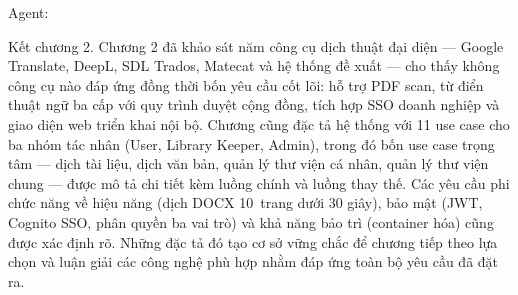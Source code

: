 Agent:

Kết chương 2. Chương 2 đã khảo sát năm công cụ dịch thuật đại diện --- Google Translate, DeepL, SDL Trados, Matecat và hệ thống đề xuất --- cho thấy không công cụ nào đáp ứng đồng thời bốn yêu cầu cốt lõi: hỗ trợ PDF scan, từ điển thuật ngữ ba cấp với quy trình duyệt cộng đồng, tích hợp SSO doanh nghiệp và giao diện web triển khai nội bộ. Chương cũng đặc tả hệ thống với 11 use case cho ba nhóm tác nhân (User, Library Keeper, Admin), trong đó bốn use case trọng tâm --- dịch tài liệu, dịch văn bản, quản lý thư viện cá nhân, quản lý thư viện chung --- được mô tả chi tiết kèm luồng chính và luồng thay thế. Các yêu cầu phi chức năng về hiệu năng (dịch DOCX 10~trang dưới 30 giây), bảo mật (JWT, Cognito SSO, phân quyền ba vai trò) và khả năng bảo trì (container hóa) cũng được xác định rõ. Những đặc tả đó tạo cơ sở vững chắc để chương tiếp theo lựa chọn và luận giải các công nghệ phù hợp nhằm đáp ứng toàn bộ yêu cầu đã đặt ra.
